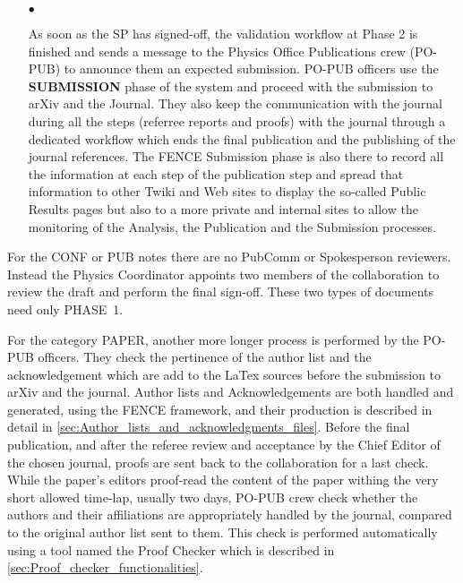 \begin{itemize}
    \item[$\bullet$]
    
As soon as the SP has signed-off, the validation workflow at Phase 2 is finished and sends a message to the Physics Office Publications crew (PO-PUB) to announce them an expected submission. PO-PUB officers use the \textbf{SUBMISSION} phase of the system and proceed with the submission to arXiv and the Journal. They also keep the communication with the journal during all the steps (referree reports and proofs) with the journal through a dedicated  workflow which ends  the final publication and the publishing of the journal references. The FENCE Submission phase is also there to record all the information at each step of the publication step and spread that information to other Twiki and Web sites to display the so-called Public Results pages but also to a more private and internal sites to allow the monitoring of the Analysis, the Publication and the Submission processes.

\end{itemize}

For the CONF or PUB notes there are no PubComm or Spokesperson reviewers. Instead the Physics Coordinator appoints two members of the collaboration to review the draft and perform the final sign-off. These two types of documents need only PHASE~1.

For the category PAPER,  another more longer process is performed by the PO-PUB officers. They check the pertinence of the author list and the acknowledgement which are add to the LaTex sources before the submission to  arXiv and the journal. Author lists and Acknowledgements are both  handled and generated, using the FENCE framework, and their production is described in detail in \cref{sec:Author_lists_and_acknowledgments_files}. Before the final publication, and after the referee review and acceptance by the Chief Editor of the chosen journal, proofs are sent back to the collaboration for a last check.  While the paper's editors proof-read the content of the paper withing the very short allowed time-lap, usually two days, PO-PUB crew check whether the authors and their affiliations are appropriately handled by the journal, compared to the original author list sent to them. This check is performed automatically using a tool named  the Proof Checker which is described in \cref{sec:Proof_checker_functionalities}.